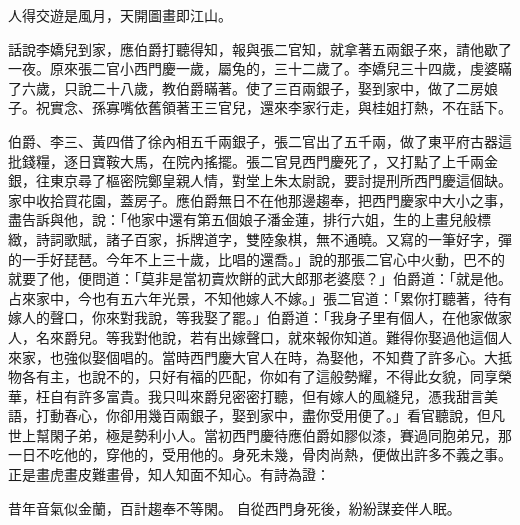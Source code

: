 人得交遊是風月，天開圖畫即江山。

話說李嬌兒到家，應伯爵打聽得知，報與張二官知，就拿著五兩銀子來，請他歇了一夜。原來張二官小西門慶一歲，屬兔的，三十二歲了。李嬌兒三十四歲，虔婆瞞了六歲，只說二十八歲，教伯爵瞞著。使了三百兩銀子，娶到家中，做了二房娘子。祝實念、孫寡嘴依舊領著王三官兒，還來李家行走，與桂姐打熱，不在話下。

伯爵、李三、黃四借了徐內相五千兩銀子，張二官出了五千兩，做了東平府古器這批錢糧，逐日寶鞍大馬，在院內搖擺。張二官見西門慶死了，又打點了上千兩金銀，往東京尋了樞密院鄭皇親人情，對堂上朱太尉說，要討提刑所西門慶這個缺。家中收拾買花園，蓋房子。應伯爵無日不在他那邊趨奉，把西門慶家中大小之事，盡告訴與他，說：「他家中還有第五個娘子潘金蓮，排行六姐，生的上畫兒般標緻，詩詞歌賦，諸子百家，拆牌道字，雙陸象棋，無不通曉。又寫的一筆好字，彈的一手好琵琶。今年不上三十歲，比唱的還喬。」說的那張二官心中火動，巴不的就要了他，便問道：「莫非是當初賣炊餅的武大郎那老婆麼？」伯爵道：「就是他。占來家中，今也有五六年光景，不知他嫁人不嫁。」張二官道：「累你打聽著，待有嫁人的聲口，你來對我說，等我娶了罷。」伯爵道：「我身子里有個人，在他家做家人，名來爵兒。等我對他說，若有出嫁聲口，就來報你知道。難得你娶過他這個人來家，也強似娶個唱的。當時西門慶大官人在時，為娶他，不知費了許多心。大抵物各有主，也說不的，只好有福的匹配，你如有了這般勢耀，不得此女貌，同享榮華，枉自有許多富貴。我只叫來爵兒密密打聽，但有嫁人的風縫兒，憑我甜言美語，打動春心，你卻用幾百兩銀子，娶到家中，盡你受用便了。」看官聽說，但凡世上幫閑子弟，極是勢利小人。當初西門慶待應伯爵如膠似漆，賽過同胞弟兄，那一日不吃他的，穿他的，受用他的。身死未幾，骨肉尚熱，便做出許多不義之事。正是畫虎畫皮難畫骨，知人知面不知心。有詩為證：

昔年音氣似金蘭，百計趨奉不等閑。
自從西門身死後，紛紛謀妾伴人眠。

